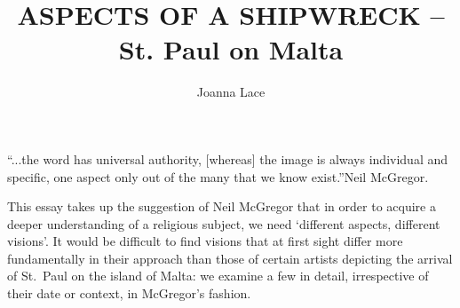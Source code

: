 \documentclass[a4paper,12pt]{article}
\begin{document}
\title{ASPECTS OF A SHIPWRECK -- St. Paul on Malta}
\author{Joanna Lace}
\date{}
\maketitle


\begin{center}
\parbox{5.5truein}{ ``...the word has universal authority, [whereas]
  the image is always individual and specific, one aspect only out of
  the many that we know exist.''\hfill Neil McGregor\footnotemark.  }
\end{center}

This essay takes up the suggestion of Neil McGregor that in order to
acquire a deeper understanding of a religious subject, we need
`different aspects, different visions'. It would be difficult to find
visions that at first sight differ more fundamentally in their
approach than those of certain artists depicting the arrival of
St.~Paul on the island of Malta: we examine a few in detail,
irrespective of their date or context, in McGregor's fashion.
\end{document}
